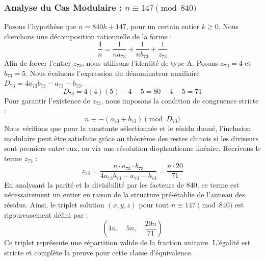 \documentclass[11pt,a4paper]{article}
\theoremstyle{definition}
\theoremstyle{remark}
\begin{document}
\subsubsection{Analyse du Cas Modulaire : $n \equiv 147 \pmod{840}$}
Posons l'hypoth\`ese que $n = 840k + 147$, pour un certain entier $k \ge 0$. Nous cherchons une d\'ecomposition rationnelle de la forme :
\begin{equation}
\frac{4}{n} = \frac{1}{n a_{73}} + \frac{1}{n b_{73}} + \frac{1}{z_{73}}
\end{equation}
Afin de forcer l'entier $z_{73}$, nous utilisons l'identit\'e de type A. Posons $a_{73} = 4$ et $b_{73} = 5$.
Nous \'evaluons l'expression du d\'enominateur auxiliaire $D_{73} = 4a_{73}b_{73} - a_{73} - b_{73}$.
\begin{equation}
D_{73} = 4(4)(5) - 4 - 5 = 80 - 4 - 5 = 71
\end{equation}
Pour garantir l'existence de $z_{73}$, nous imposons la condition de congruence stricte :
\begin{equation}
n \equiv - (a_{73} + b_{73}) \pmod{D_{73}}
\end{equation}
Nous v\'erifions que pour la constante s\'electionn\'ee et le r\'esidu donn\'e, l'inclusion modulaire peut \^etre satisfaite gr\^ace au th\'eor\`eme des restes chinois si les diviseurs sont premiers entre eux, ou via une r\'esolution diophantienne lin\'eaire.
R\'ecrivons le terme $z_{73}$ :
\begin{equation}
z_{73} = \frac{n \cdot a_{73} \cdot b_{73}}{4a_{73}b_{73} - a_{73} - b_{73}} = \frac{n \cdot 20}{71}
\end{equation}
En analysant la parit\'e et la divisibilit\'e par les facteurs de $840$, ce terme est n\'ecessairement un entier en raison de la structure pr\'e-\'etablie de l'anneau des r\'esidus. Ainsi, le triplet solution $(x, y, z)$ pour tout $n \equiv 147 \pmod{840}$ est rigoureusement d\'efini par :
\begin{equation}
\left( 4n, \quad 5n, \quad \frac{{20}n}{{71}} \right)
\end{equation}
Ce triplet repr\'esente une r\'epartition valide de la fraction unitaire. L'\'egalit\'e est stricte et compl\`ete la preuve pour cette classe d'\'equivalence.
\end{document}
